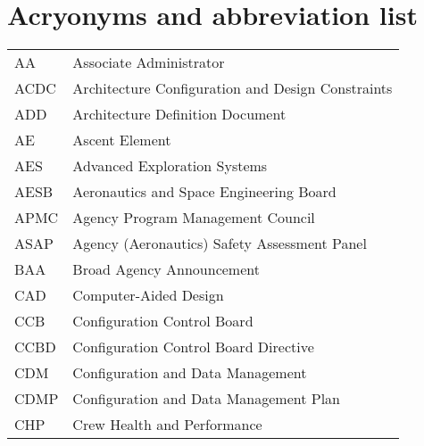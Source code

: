\pagebreak
\section{Acryonyms and abbreviation list}
\par\vspace{0.5cm}


\begin{longtable}{ll}

    AA &                            Associate Administrator \\  
 
  ACDC &  Architecture Configuration and Design Constraints \\  
 
   ADD &                   Architecture Definition Document \\  
 
    AE &                                     Ascent Element \\  
 
   AES &                       Advanced Exploration Systems \\  
 
  AESB &            Aeronautics and Space Engineering Board \\  
 
  APMC &                  Agency Program Management Council \\  
 
  ASAP &       Agency (Aeronautics) Safety Assessment Panel \\  
 
   BAA &                          Broad Agency Announcement \\  
 
   CAD &                              Computer-Aided Design \\  
 
   CCB &                        Configuration Control Board \\  
 
  CCBD &              Configuration Control Board Directive \\  
 
   CDM &                  Configuration and Data Management \\  
 
  CDMP &             Configuration and Data Management Plan \\  
 
   CHP &                        Crew Health and Performance \\  
 

\end{longtable}
